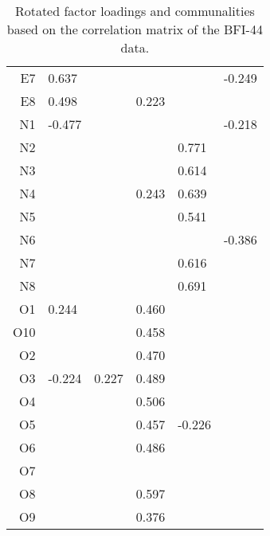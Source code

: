 \begin{table}[ht]
\begin{tabular}{rlllll}
  E7 &  0.637 &        &        &        & -0.249 \\ 
  E8 &  0.498 &        &  0.223 &        &        \\ 
  N1 & -0.477 &        &        &        & -0.218 \\ 
  N2 &        &        &        &  0.771 &        \\ 
  N3 &        &        &        &  0.614 &        \\ 
  N4 &        &        &  0.243 &  0.639 &        \\ 
  N5 &        &        &        &  0.541 &        \\ 
  N6 &        &        &        &        & -0.386 \\ 
  N7 &        &        &        &  0.616 &        \\ 
  N8 &        &        &        &  0.691 &        \\ 
  O1 &  0.244 &        &  0.460 &        &        \\ 
  O10 &        &        &  0.458 &        &        \\ 
  O2 &        &        &  0.470 &        &        \\ 
  O3 & -0.224 &  0.227 &  0.489 &        &        \\ 
  O4 &        &        &  0.506 &        &        \\ 
  O5 &        &        &  0.457 & -0.226 &        \\ 
  O6 &        &        &  0.486 &        &        \\ 
  O7 &        &        &        &        &        \\ 
  O8 &        &        &  0.597 &        &        \\ 
  O9 &        &        &  0.376 &        &        \\ 
   \bottomrule
\end{tabular}
\caption{Rotated factor loadings and communalities based on the correlation matrix of the BFI-44 data.} 
\label{tab:loadingsbfi}
\end{table}

